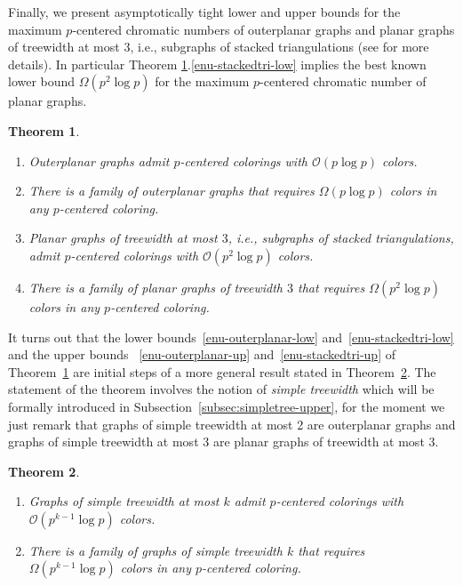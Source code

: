 \documentclass[11pt]{article}
\newtheorem{theorem}{Theorem}
\begin{document}
Finally, we present asymptotically tight lower and upper bounds for
the maximum $p$-centered chromatic numbers of outerplanar graphs 
and planar graphs of treewidth at most $3$, i.e., subgraphs of stacked triangulations (see \cite{KV12} for more details).
In particular Theorem \ref{thm:pb+p-bounds}.\ref{enu-stackedtri-low} implies the best known lower bound
$\Omega(p^2\log p)$ for the maximum $p$-centered chromatic number
of planar graphs.

\begin{theorem}\label{thm:pb+p-bounds}\hfill
\begin{enumerate}[label=\textup{(\roman*)},nosep]
\item Outerplanar graphs admit $p$-centered colorings with $\mathcal{O}(p\log p)$ colors.
\label{enu-outerplanar-up}
\item There is a family of outerplanar graphs that requires $\Omega(p\log p)$ colors in any $p$-centered coloring.
\label{enu-outerplanar-low}
\item Planar graphs of treewidth at most $3$, 
i.e., subgraphs of stacked triangulations, 
admit $p$-centered colorings with $\mathcal{O}(p^2\log p)$ colors.
\label{enu-stackedtri-up}
\item There is a family of planar graphs of treewidth $3$ that requires $\Omega(p^2\log p)$ colors in any $p$-centered coloring.
\label{enu-stackedtri-low}
\end{enumerate}
\label{thm:planarclasses}
\end{theorem}

It turns out that the lower bounds~\ref{enu-outerplanar-low} and~\ref{enu-stackedtri-low}
and the upper bounds ~\ref{enu-outerplanar-up} and~\ref{enu-stackedtri-up} of Theorem~\ref{thm:pb+p-bounds} are initial steps of a more general result stated in Theorem~\ref{thm:simpletree}.
The statement of the theorem involves the notion of
\emph{simple treewidth} which will be formally introduced in
Subsection~\ref{subsec:simpletree-upper}, for the moment we just remark that
graphs of simple treewidth at most 2 are outerplanar graphs and graphs of
simple treewidth at most 3 are planar graphs of treewidth at most 3.

\begin{theorem}\label{thm:simpletree}\hfill
  \begin{enumerate}[label=\textup{(\roman*)},nosep]
  \item \label{enu-simpletree-up}
    Graphs of simple treewidth at most $k$ admit $p$-centered colorings
    with $\mathcal{O}(p^{k-1}\log p)$ colors.
  \item \label{enu-simpletree-low}
    There is a family of graphs of simple treewidth $k$ that requires
    $\Omega(p^{k-1}\log p)$ colors in any $p$-centered coloring.
  \end{enumerate} 
\end{theorem}
\end{document}
